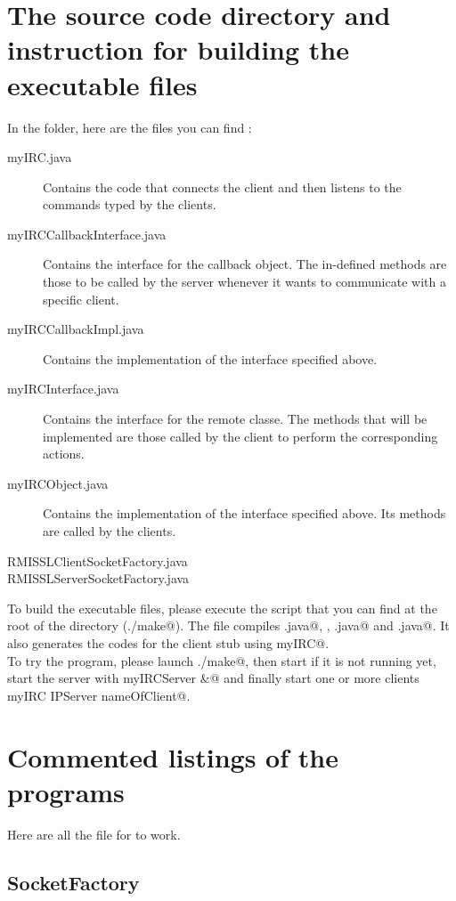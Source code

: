 \documentclass{article}
\begin{document}
\section{The source code directory and instruction for building the executable files}
In the \verb@src@ folder, here are the files you can find : 
\begin{description}
\item[myIRC.java] Contains the code that connects the client and then listens to the commands typed by the clients.
\item[myIRCCallbackInterface.java] Contains the interface for the callback object. The in-defined methods are those to be called by the server whenever it wants to communicate with a specific client.
\item[myIRCCallbackImpl.java] Contains the implementation of the interface specified above.
\item[myIRCInterface.java] Contains the interface for the remote classe. The methods that will be implemented are those called by the client to perform the corresponding actions.
\item[myIRCObject.java] Contains the implementation of the interface specified above. Its methods are called by the clients.
\item[RMISSLClientSocketFactory.java] 
\item[RMISSLServerSocketFactory.java] 
\end{description}

To build the executable files, please execute the script \verb@make@ that you can find at the root of the directory (\verb@./make@). The \verb@make@ file compiles \verb@myIRCObject.java@, \verb@myIRCCallbackImpl@, \verb@myIRCServer.java@ and \verb@myIRC.java@. It also generates the codes for the client stub using \verb@rmic myIRC@.\\

To try the program, please launch \verb@./make@, then start \verb@rmiregistry@ if it is not running yet, start the server with \verb@java myIRCServer &@ and finally start one or more clients \verb@java myIRC IPServer nameOfClient@.

\section{Commented listings of the programs}
Here are all the file for \verb@myIRC@ to work.

\subsection{SocketFactory}~
    
    
\end{document}
